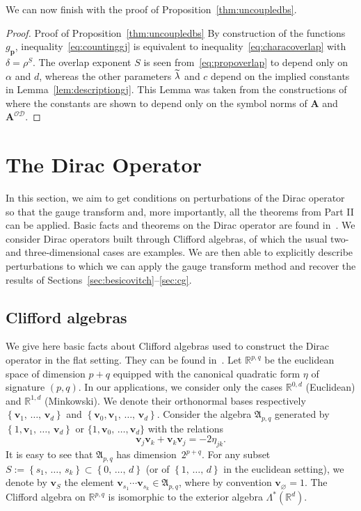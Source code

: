\documentclass[AHL,Unicode,longabstracts,published]{cedram}
\newcommand{\R}{\mathbb R}
\newcommand{\CD}{\mathcal{D}}
\newcommand{\CO}{\mathcal{O}}
\newcommand{\BA}{\mathbf A}
\newcommand{\bp}{\mathbf p}
\newcommand{\bv}{\mathbf v}
\newcommand{\FA}{\mathfrak A}
\newcommand{\set}[1]{\left\{ #1 \right\}}
\let\oldtilde\tilde
\renewcommand*{\tilde}[1]{\mathchoice{\widetilde{#1}}{\widetilde{#1}}{\oldtilde{#1}}{\oldtilde{#1}}}
\begin{document}
We can now finish with the proof of Proposition~\ref{thm:uncoupledbs}.

\begin{proof}
{Proof of Proposition~\ref{thm:uncoupledbs}}
By construction of the functions $g_\bp$, inequality~\eqref{eq:countinggj} is equivalent to inequality~\eqref{eq:characoverlap} with $\delta = \rho^S$. The overlap exponent $S$ is seen from~\eqref{eq:propoverlap} to depend only on $\alpha$ and $d$, whereas the other parameters $\tilde \lambda$ and $c$ depend on the implied constants in Lemma~\ref{lem:descriptiongj}. This Lemma was taken from the constructions of~\cite[Section~7]{ParSob2010} where the constants are shown to depend only on the symbol norms of $\BA$ and $\BA^{\CO\CD}$.
\end{proof}



\section{The Dirac Operator} \label{sec:dirac}

In this section, we aim to get conditions on perturbations of the Dirac operator so that the gauge transform and, more importantly, all the theorems from Part II can be applied. Basic facts and theorems on the Dirac operator are found in~\cite{gilbertmurray,thaller}. We consider Dirac operators built through Clifford algebras, of which the usual two- and three-dimensional cases are examples. We are then able to explicitly describe perturbations to which we can apply the gauge transform method and recover the results of Sections~\ref{sec:besicovitch}--\ref{sec:cg}.

\subsection{Clifford algebras} \label{sec:clifford}

We give here basic facts about Clifford algebras used to construct the Dirac operator in the flat setting. They can be found in~\cite[Section~7]{gilbertmurray}. Let $\R^{p,q}$ be the euclidean space of dimension $p+q$ equipped with the canonical quadratic form $\eta$ of signature $(p,q)$. In our applications, we consider only the cases $\R^{0,d}$ (Euclidean) and $\R^{1,d}$ (Minkowski). We denote their orthonormal bases respectively $\set{\bv_1,\,\dotsc,\,\bv_d}$ and $\set{\bv_0,\bv_1,\,\dotsc,\,\bv_d}$. Consider the algebra $\FA_{p,q}$ generated by $\set{1,\bv_1,\,\dotsc,\,\bv_d}$ or $\{1,\bv_0,\,\dotsc,\bv_d\}$ with the relations
\begin{equation}\label{eq:anticommute}
\bv_j \bv_k + \bv_k \bv_j = - 2\eta_{jk}.
\end{equation}
It is easy to see that $\FA_{p,q}$ has dimension~$2^{p+q}$. For any subset $S := \set{s_1,\,\dotsc,\,s_k} \subset \set{0,\,\dotsc,\,d}$ (or of $\set{1,\,\dotsc,\,d}$ in the euclidean setting), we denote by $\bv_S$ the element $\bv_{s_1} \cdots \bv_{s_k} \in \FA_{p,q}$, where by convention $\bv_\varnothing = 1$. The Clifford algebra on $\R^{p,q}$ is isomorphic to the exterior algebra $\Lambda^*(\R^d)$.
\end{document}
